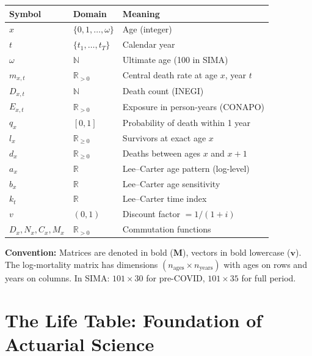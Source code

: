 \documentclass[11pt,a4paper]{article}
\theoremstyle{definition}
\newcommand{\R}{\mathbb{R}}
\begin{document}
\begin{center}
\begin{tabular}{lll}
\toprule
\textbf{Symbol} & \textbf{Domain} & \textbf{Meaning} \\
\midrule
$x$ & $\{0, 1, \ldots, \omega\}$ & Age (integer) \\
$t$ & $\{t_1, \ldots, t_T\}$ & Calendar year \\
$\omega$ & $\mathbb{N}$ & Ultimate age (100 in SIMA) \\
$m_{x,t}$ & $\R_{>0}$ & Central death rate at age $x$, year $t$ \\
$D_{x,t}$ & $\mathbb{N}$ & Death count (INEGI) \\
$E_{x,t}$ & $\R_{>0}$ & Exposure in person-years (CONAPO) \\
$q_x$ & $[0,1]$ & Probability of death within 1 year \\
$l_x$ & $\R_{\geq 0}$ & Survivors at exact age $x$ \\
$d_x$ & $\R_{\geq 0}$ & Deaths between ages $x$ and $x+1$ \\
$a_x$ & $\R$ & Lee--Carter age pattern (log-level) \\
$b_x$ & $\R$ & Lee--Carter age sensitivity \\
$k_t$ & $\R$ & Lee--Carter time index \\
$v$ & $(0,1)$ & Discount factor $= 1/(1+i)$ \\
$D_x, N_x, C_x, M_x$ & $\R_{>0}$ & Commutation functions \\
\bottomrule
\end{tabular}
\end{center}

\textbf{Convention:} Matrices are denoted in bold ($\bm{M}$), vectors in
bold lowercase ($\bm{v}$). The log-mortality matrix has dimensions
$(n_{\text{ages}} \times n_{\text{years}})$ with ages on rows and years on
columns. In SIMA: $101 \times 30$ for pre-COVID, $101 \times 35$ for full period.

\section{The Life Table: Foundation of Actuarial Science}
\label{sec:life-table}
\end{document}
